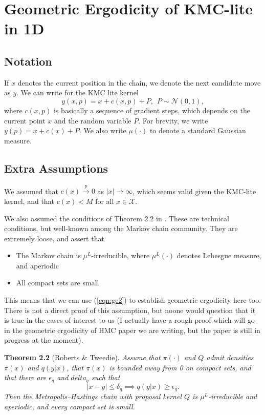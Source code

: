 \documentclass{article}
\newcommand{\X}{\mathcal{X}}
\begin{document}
\section{Geometric Ergodicity of KMC-lite in 1D}

\subsection{Notation}

If $x$ denotes the current position in the chain, we denote the next candidate move as $y$.  We can write for the KMC lite kernel
\[
y(x,p) = x + c(x,p) + P, ~~ P \sim \mathcal{N}(0,1),
\]
where $c(x,p)$ is basically a sequence of gradient steps, which depends on the current point $x$ and the random variable $P$.  For brevity, we write $y(p) = x + c(x) + P$.  We also write $\mu(\cdot)$ to denote a standard Gaussian measure.

\subsection{Extra Assumptions}

We assumed that $c(x) \xrightarrow{p} 0$ as $|x| \to \infty$, which seems valid given the KMC-lite kernel, and that $c(x) < M$ for all $x \in \X$.

We also assumed the conditions of Theorem 2.2 in \cite{}.  These are technical conditions, but well-known among the Markov chain community.  They are extremely loose, and assert that
\begin{itemize}
\item The Markov chain is $\mu^L$-irreducible, where $\mu^L(\cdot)$ denotes Lebesgue measure, and aperiodic
\item All compact sets are small
\end{itemize}
This means that we can use (\ref{eqn:ge2}) to establish geometric ergodicity here too.  There is not a direct proof of this assumption, but noone would question that it is true in the cases of interest to us (I actually have a rough proof which will go in the geometric ergodicity of HMC paper we are writing, but the paper is still in progress at the moment).

\textbf{Theorem 2.2} (Roberts \& Tweedie).  {\itshape Assume that $\pi(\cdot)$ and $Q$ admit densities $\pi(x)$ and $q(y|x)$, that $\pi(x)$ is bounded away from 0 on compact sets, and that there are $\epsilon_q$ and $delta_q$ such that
\[
|x - y| \leq \delta_q \implies q(y|x) \geq \epsilon_q.
\]
Then the Metropolis--Hastings chain with proposal kernel $Q$ is $\mu^L$-irreducible and aperiodic, and every compact set is small.}
\end{document}

